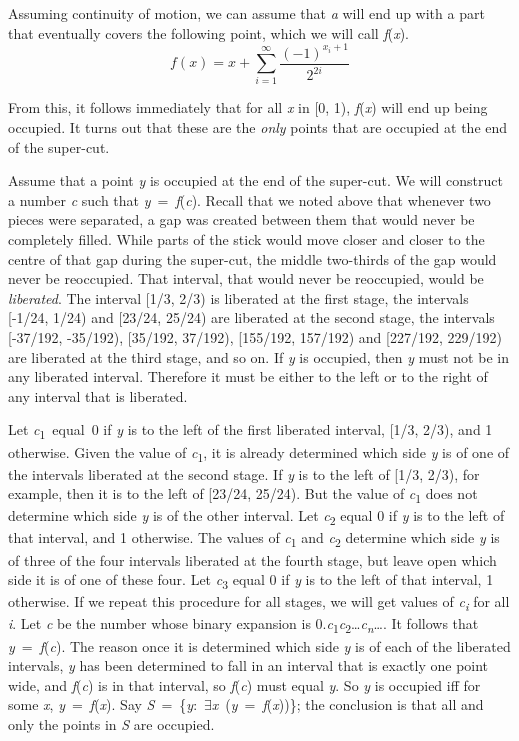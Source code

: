 \documentclass[
  11pt,
  letterpaper,
  DIV=11,
  numbers=noendperiod,
  twoside]{scrartcl}
\begin{document}
Assuming continuity of motion, we can assume that \emph{a} will end up
with a part that eventually covers the following point, which we will
call \emph{f}(\emph{x}).
\[f(x) = x + \sum_{i=1}^{\infty}\frac{(-1)^{x_i + 1}}{2^{2i}}\]

From this, it follows immediately that for all \emph{x} in {[}0, 1),
\emph{f}(\emph{x}) will end up being occupied. It turns out that these
are the \emph{only} points that are occupied at the end of the
super-cut.

Assume that a point \emph{y} is occupied at the end of the super-cut. We
will construct a number \emph{c} such that
\emph{y}~=~\emph{f}(\emph{c}). Recall that we noted above that whenever
two pieces were separated, a gap was created between them that would
never be completely filled. While parts of the stick would move closer
and closer to the centre of that gap during the super-cut, the middle
two-thirds of the gap would never be reoccupied. That interval, that
would never be reoccupied, would be \emph{liberated}. The interval
{[}1/3, 2/3) is liberated at the first stage, the intervals {[}-1/24,
1/24) and {[}23/24, 25/24) are liberated at the second stage, the
intervals {[}-37/192, -35/192), {[}35/192, 37/192), {[}155/192, 157/192)
and {[}227/192, 229/192) are liberated at the third stage, and so on. If
\emph{y} is occupied, then \emph{y} must not be in any liberated
interval. Therefore it must be either to the left or to the right of any
interval that is liberated.

Let \emph{c}\textsubscript{1}~equal~0 if \emph{y} is to the left of the
first liberated interval, {[}1/3, 2/3), and 1 otherwise. Given the value
of \emph{c}\textsubscript{1}, it is already determined which side
\emph{y} is of one of the intervals liberated at the second stage. If
\emph{y} is to the left of {[}1/3, 2/3), for example, then it is to the
left of {[}23/24, 25/24). But the value of \emph{c}\textsubscript{1}
does not determine which side \emph{y} is of the other interval. Let
\emph{c}\textsubscript{2} equal 0 if \emph{y} is to the left of that
interval, and 1 otherwise. The values of \emph{c}\textsubscript{1} and
\emph{c}\textsubscript{2} determine which side \emph{y} is of three of
the four intervals liberated at the fourth stage, but leave open which
side it is of one of these four. Let \emph{c}\textsubscript{3} equal 0
if \emph{y} is to the left of that interval, 1 otherwise. If we repeat
this procedure for all stages, we will get values of
\emph{c\textsubscript{i}} for all \emph{i}. Let \emph{c} be the number
whose binary expansion is
0.\emph{c}\textsubscript{1}\emph{c}\textsubscript{2}\ldots{}\emph{c\textsubscript{n}}\ldots.
It follows that \emph{y}~=~\emph{f}(\emph{c}). The reason once it is
determined which side \emph{y} is of each of the liberated intervals,
\emph{y} has been determined to fall in an interval that is exactly one
point wide, and \emph{f}(\emph{c}) is in that interval, so
\emph{f}(\emph{c}) must equal \emph{y}. So \emph{y} is occupied iff for
some \emph{x}, \emph{y}~=~\emph{f}(\emph{x}). Say
\emph{S}~=~\{\emph{y}:~\({\exists}\)\emph{x}~(\emph{y}~=~\emph{f}(\emph{x}))\};
the conclusion is that all and only the points in \emph{S} are occupied.
\end{document}
